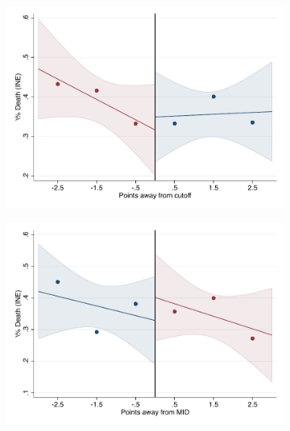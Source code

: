 \documentclass[oneside,11pt]{article}
\begin{document}
\begin{figure}[H]

    \ContinuedFloat
    \caption{(Cont.) RD plots for outcome variables across those assigned to IPN high-school, and those who are not\label{fig:ITT_rd_plot_IPN_4}}
    \begin{center}
    
    \begin{subfigure}{0.475\textwidth}
        \centering
        \includegraphics[width=\textwidth]{04_Figures/rd_plot_tau_Death_INE_IPN3.pdf}
    \end{subfigure}
    \begin{subfigure}{0.475\textwidth}
        \centering
        \includegraphics[width=\textwidth]{04_Figures/rd_plot_mid_Death_INE_IPN3.pdf}
    \end{subfigure}


\end{center}
\end{figure}
\end{document}
